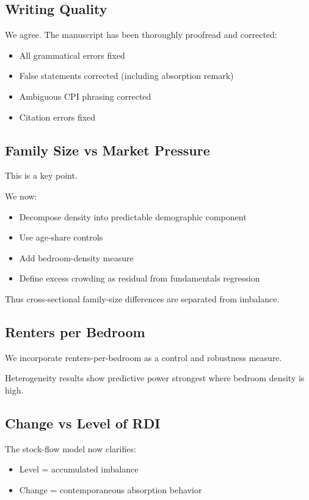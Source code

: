 \documentclass[12pt]{article}
\begin{document}
\subsection*{Writing Quality}

We agree. The manuscript has been thoroughly proofread and corrected:

\begin{itemize}
\item All grammatical errors fixed
\item False statements corrected (including absorption remark)
\item Ambiguous CPI phrasing corrected
\item Citation errors fixed
\end{itemize}

\subsection*{Family Size vs Market Pressure}

This is a key point.

We now:

\begin{itemize}
\item Decompose density into predictable demographic component
\item Use age-share controls
\item Add bedroom-density measure
\item Define excess crowding as residual from fundamentals regression
\end{itemize}

Thus cross-sectional family-size differences are separated from imbalance.

\subsection*{Renters per Bedroom}

We incorporate renters-per-bedroom as a control and robustness measure.

Heterogeneity results show predictive power strongest where bedroom density is high.

\subsection*{Change vs Level of RDI}

The stock-flow model now clarifies:

\begin{itemize}
\item Level = accumulated imbalance
\item Change = contemporaneous absorption behavior
\end{itemize}
\end{document}
